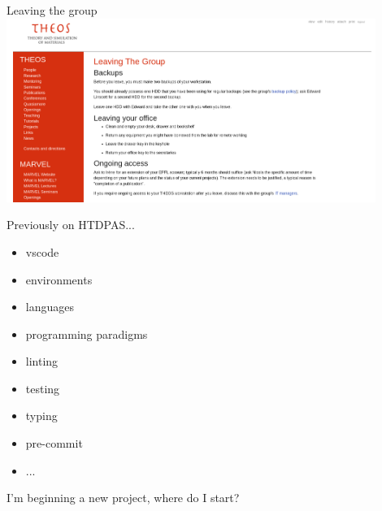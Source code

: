 \documentclass[xcolor=table,aspectratio=169]{beamer}
\numberwithin{equation}{section}
\begin{document}
\begin{frame}{Leaving the group}
  \centering
  \includegraphics[width=0.9\textwidth]{figures/leaving_the_group.png}
\end{frame}

\frame{\titlepage}

%
\begin{frame}{Previously on HTDPAS...}
  \begin{itemize}
    \item vscode
    \item environments
    \item languages
    \item programming paradigms
    \item linting
    \item testing
    \item typing
    \item pre-commit
    \item ...
  \end{itemize}

  I'm beginning a new project, where do I start?

\end{frame}
\end{document}
